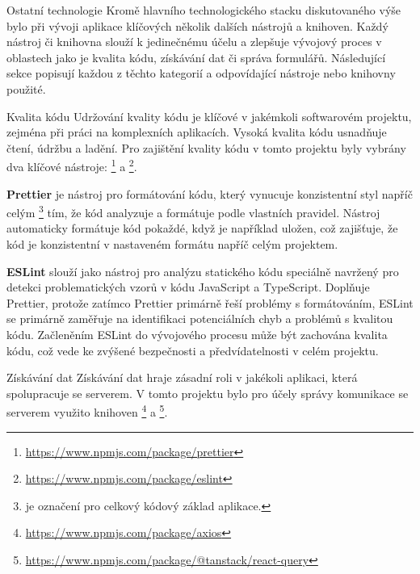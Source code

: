 \begin{subsection}{Ostatní technologie}
    \label{subsec:implementace-technologie-ostatni}
    Kromě hlavního technologického stacku diskutovaného výše bylo při vývoji aplikace klíčových několik dalších nástrojů a knihoven.
    Každý nástroj či knihovna slouží k jedinečnému účelu a zlepšuje vývojový proces v oblastech jako je kvalita kódu, získávání dat či správa formulářů.
    Následující sekce popisují každou z těchto kategorií a odpovídající nástroje nebo knihovny použité.

    \begin{subsubsection}{Kvalita kódu}
        \label{subsubsec:implementace-technologie-ostatni-kvalita}
        Udržování kvality kódu je klíčové v jakémkoli softwarovém projektu, zejména při práci na komplexních aplikacích.
        Vysoká kvalita kódu usnadňuje čtení, údržbu a ladění.
        Pro zajištění kvality kódu v tomto projektu byly vybrány dva klíčové nástroje: \footnote{\url{https://www.npmjs.com/package/prettier}} a \footnote{\url{https://www.npmjs.com/package/eslint}}.

        \textbf{Prettier} je nástroj pro formátování kódu, který vynucuje konzistentní styl napříč celým \footnote{ je označení pro celkový kódový základ aplikace.} tím, že kód analyzuje a formátuje podle vlastních pravidel.
        Nástroj automaticky formátuje kód pokaždé, když je například uložen, což zajišťuje, že kód je konzistentní v nastaveném formátu napříč celým projektem\cite{p__prettier_io}.

        \textbf{ESLint} slouží jako nástroj pro analýzu statického kódu speciálně navržený pro detekci problematických vzorů v kódu JavaScript a TypeScript.
        Doplňuje Prettier, protože zatímco Prettier primárně řeší problémy s formátováním, ESLint se primárně zaměřuje na identifikaci potenciálních chyb a problémů s kvalitou kódu.
        Začleněním ESLint do vývojového procesu může být zachována kvalita kódu, což vede ke zvýšené bezpečnosti a předvídatelnosti v celém projektu\cite{e__eslint_org}.
    \end{subsubsection}

    \begin{subsubsection}{Získávání dat}
        \label{subsubsec:implementace-technologie-ostatni-ziskavani}
        Získávání dat hraje zásadní roli v jakékoli aplikaci, která spolupracuje se serverem.
        V tomto projektu bylo pro účely správy komunikace se serverem využito knihoven \footnote{\url{https://www.npmjs.com/package/axios}} a \footnote{\url{https://www.npmjs.com/package/@tanstack/react-query}}.


\end{subsubsection}
\end{subsection}
